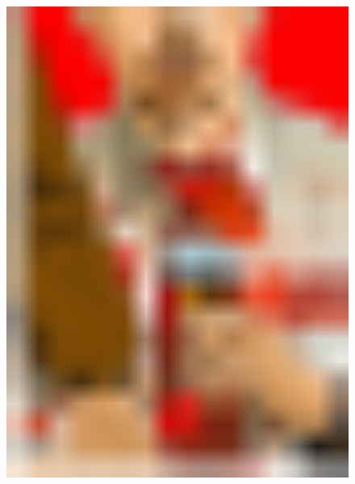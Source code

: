 \documentclass[12pt, a4paper]{article}
\begin{document}
\begin{figure}
\begin{minipage}[h!]{0.3\linewidth}
\end{minipage}
\hfil
\begin{minipage}[h!]{0.3\linewidth}
\includegraphics[width=1\textwidth, height = 0.32\textheight]{pop3}
\end{minipage}


\end{figure}
\end{document}
